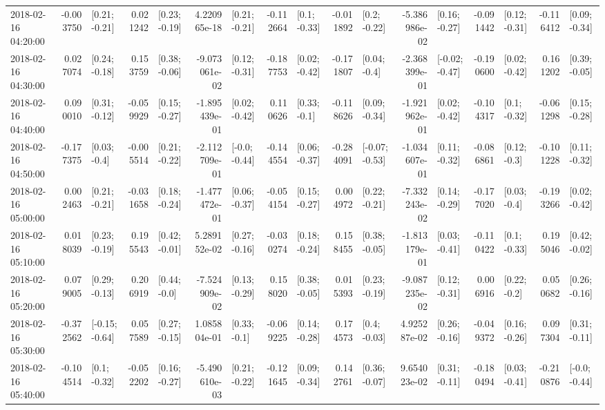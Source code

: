 \begin{tabular}{lrlrlrlrlrlrlrlrl}
2018-02-16 04:20:00 & -0.003750 &   [0.21; -0.21] &  0.021242 &   [0.23; -0.19] &  4.220965e-18 &   [0.21; -0.21] & -0.112664 &    [0.1; -0.33] & -0.011892 &    [0.2; -0.22] & -5.386986e-02 &   [0.16; -0.27] & -0.091442 &   [0.12; -0.31] & -0.116412 &   [0.09; -0.34] \\
2018-02-16 04:30:00 &  0.027074 &   [0.24; -0.18] &  0.153759 &   [0.38; -0.06] & -9.073061e-02 &   [0.12; -0.31] & -0.187753 &   [0.02; -0.42] & -0.171807 &    [0.04; -0.4] & -2.368399e-01 &  [-0.02; -0.47] & -0.190600 &   [0.02; -0.42] &  0.161202 &   [0.39; -0.05] \\
2018-02-16 04:40:00 &  0.090010 &   [0.31; -0.12] & -0.059929 &   [0.15; -0.27] & -1.895439e-01 &   [0.02; -0.42] &  0.110626 &    [0.33; -0.1] & -0.118626 &   [0.09; -0.34] & -1.921962e-01 &   [0.02; -0.42] & -0.104317 &    [0.1; -0.32] & -0.061298 &   [0.15; -0.28] \\
2018-02-16 04:50:00 & -0.177375 &    [0.03; -0.4] & -0.005514 &   [0.21; -0.22] & -2.112709e-01 &   [-0.0; -0.44] & -0.144554 &   [0.06; -0.37] & -0.284091 &  [-0.07; -0.53] & -1.034607e-01 &   [0.11; -0.32] & -0.086861 &    [0.12; -0.3] & -0.101228 &   [0.11; -0.32] \\
2018-02-16 05:00:00 &  0.002463 &   [0.21; -0.21] & -0.031658 &   [0.18; -0.24] & -1.477472e-01 &   [0.06; -0.37] & -0.054154 &   [0.15; -0.27] &  0.004972 &   [0.22; -0.21] & -7.332243e-02 &   [0.14; -0.29] & -0.177020 &    [0.03; -0.4] & -0.193266 &   [0.02; -0.42] \\
2018-02-16 05:10:00 &  0.018039 &   [0.23; -0.19] &  0.195543 &   [0.42; -0.01] &  5.289152e-02 &   [0.27; -0.16] & -0.030274 &   [0.18; -0.24] &  0.158455 &   [0.38; -0.05] & -1.813179e-01 &   [0.03; -0.41] & -0.110422 &    [0.1; -0.33] &  0.195046 &   [0.42; -0.02] \\
2018-02-16 05:20:00 &  0.079005 &   [0.29; -0.13] &  0.206919 &    [0.44; -0.0] & -7.524909e-02 &   [0.13; -0.29] &  0.158020 &   [0.38; -0.05] &  0.015393 &   [0.23; -0.19] & -9.087235e-02 &   [0.12; -0.31] &  0.006916 &    [0.22; -0.2] &  0.050682 &   [0.26; -0.16] \\
2018-02-16 05:30:00 & -0.372562 &  [-0.15; -0.64] &  0.057589 &   [0.27; -0.15] &  1.085804e-01 &    [0.33; -0.1] & -0.069225 &   [0.14; -0.28] &  0.174573 &    [0.4; -0.03] &  4.925287e-02 &   [0.26; -0.16] & -0.049372 &   [0.16; -0.26] &  0.097304 &   [0.31; -0.11] \\
2018-02-16 05:40:00 & -0.104514 &    [0.1; -0.32] & -0.052202 &   [0.16; -0.27] & -5.490610e-03 &   [0.21; -0.22] & -0.121645 &   [0.09; -0.34] &  0.142761 &   [0.36; -0.07] &  9.654023e-02 &   [0.31; -0.11] & -0.180494 &   [0.03; -0.41] & -0.210876 &   [-0.0; -0.44] \\

\end{tabular}
